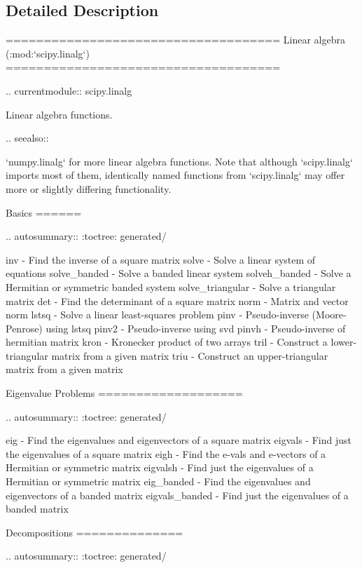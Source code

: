 \subsection{Detailed Description}
\begin{DoxyVerb}====================================
Linear algebra (:mod:`scipy.linalg`)
====================================

.. currentmodule:: scipy.linalg

Linear algebra functions.

.. seealso::

   `numpy.linalg` for more linear algebra functions.  Note that
   although `scipy.linalg` imports most of them, identically named
   functions from `scipy.linalg` may offer more or slightly differing
   functionality.


Basics
======

.. autosummary::
   :toctree: generated/

   inv - Find the inverse of a square matrix
   solve - Solve a linear system of equations
   solve_banded - Solve a banded linear system
   solveh_banded - Solve a Hermitian or symmetric banded system
   solve_triangular - Solve a triangular matrix
   det - Find the determinant of a square matrix
   norm - Matrix and vector norm
   lstsq - Solve a linear least-squares problem
   pinv - Pseudo-inverse (Moore-Penrose) using lstsq
   pinv2 - Pseudo-inverse using svd
   pinvh - Pseudo-inverse of hermitian matrix
   kron - Kronecker product of two arrays
   tril - Construct a lower-triangular matrix from a given matrix
   triu - Construct an upper-triangular matrix from a given matrix

Eigenvalue Problems
===================

.. autosummary::
   :toctree: generated/

   eig - Find the eigenvalues and eigenvectors of a square matrix
   eigvals - Find just the eigenvalues of a square matrix
   eigh - Find the e-vals and e-vectors of a Hermitian or symmetric matrix
   eigvalsh - Find just the eigenvalues of a Hermitian or symmetric matrix
   eig_banded - Find the eigenvalues and eigenvectors of a banded matrix
   eigvals_banded - Find just the eigenvalues of a banded matrix

Decompositions
==============

.. autosummary::
   :toctree: generated/


\end{DoxyVerb}
